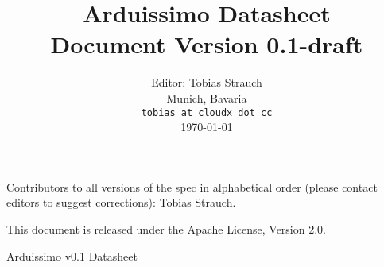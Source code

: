 \documentclass[twoside,11pt]{book}
\newcommand{\specrev}{0.1-draft}
\begin{document}
\title{\vspace{-0.7in}\Large {\bf Arduissimo Datasheet} \\
  Document Version \specrev
  \vspace{-0.1in}}

\author{Editor: Tobias Strauch \\
  Munich, Bavaria \\
  {\tt tobias at cloudx dot cc} \\
  \today
}
\date{} 

\maketitle

Contributors to all versions of the spec in
alphabetical order (please contact editors to suggest
corrections):
Tobias Strauch.

This document is released under the Apache License, Version 2.0.




{Arduissimo v0.1 Datasheet}
\thispagestyle{empty}

\frontmatter



\tableofcontents

\mainmatter











\appendix


\end{document}
